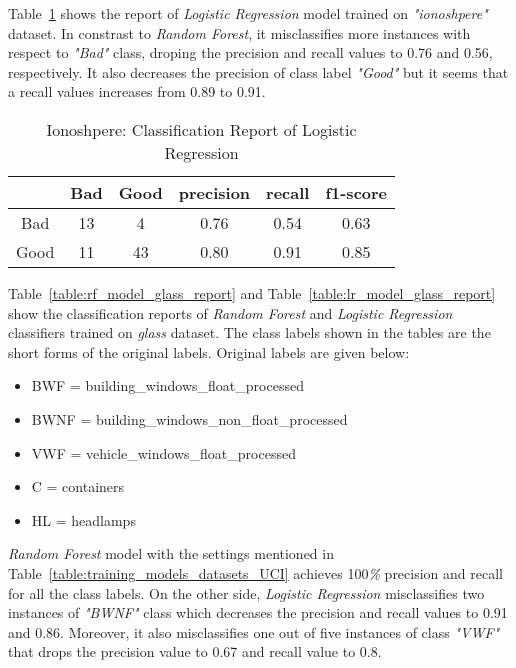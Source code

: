 \documentclass[english]{tktltiki2}
\theoremstyle{definition}
\theoremstyle{remark}
\begin{document}
Table~\ref{table:lr_model_iono_report} shows the report of \textit{Logistic Regression} model trained on \textit{"ionoshpere"} dataset. In constrast to \textit{Random Forest}, it misclassifies more instances with respect to \textit{"Bad"} class, droping the precision and recall values to 0.76 and 0.56, respectively. It also decreases the precision of class label \textit{"Good"} but it seems that a recall values increases from 0.89 to 0.91.

\begin{table}[H]
	\begin{center}
		\caption{Ionoshpere: Classification Report of Logistic Regression}
		\label{table:lr_model_iono_report}
		\begin{tabular}{@{}cccccc@{}}
			\toprule
			& Bad & Good & precision & recall & f1-score \\ \hline
			\multicolumn{1}{|c|}{Bad} & \multicolumn{1}{c|}{13} & \multicolumn{1}{c|}{4} & \multicolumn{1}{c|}{0.76} & \multicolumn{1}{c|}{0.54} & \multicolumn{1}{c|}{0.63} \\ \hline
			\multicolumn{1}{|c|}{Good} & \multicolumn{1}{c|}{11} & \multicolumn{1}{c|}{43} & \multicolumn{1}{c|}{0.80} & \multicolumn{1}{c|}{0.91} & \multicolumn{1}{c|}{0.85} \\ \hline
		\end{tabular}
	\end{center}
\end{table}

Table~\ref{table:rf_model_glass_report} and Table~\ref{table:lr_model_glass_report} show the classification reports of 
\textit{Random Forest} and \textit{Logistic Regression} classifiers trained on \textit{glass} dataset. The class labels shown in the tables are the short forms of the original labels. Original labels are given below:
\begin{itemize}
	\item BWF = building\_windows\_float\_processed
	\item BWNF = building\_windows\_non\_float\_processed
	\item VWF = vehicle\_windows\_float\_processed
	\item C = containers
	\item HL = headlamps
\end{itemize}

\textit{Random Forest} model with the settings mentioned in Table~\ref{table:training_models_datasets_UCI} achieves 100\textit{\%} precision and recall for all the class labels. On the other side, \textit{Logistic Regression} misclassifies two instances of \textit{"BWNF"} class which decreases the precision and recall values to 0.91 and 0.86. Moreover, it also misclassifies one out of five instances of class \textit{"VWF"} that drops the precision value to 0.67 and recall value to 0.8.
\end{document}

